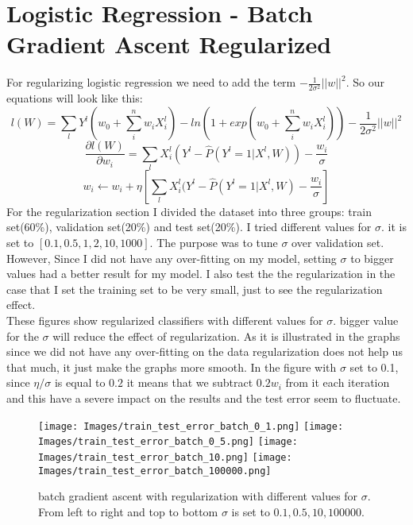 \documentclass[12pt]{article}
\begin{document}
\section{Logistic Regression - Batch Gradient Ascent Regularized}
For regularizing logistic regression we need to add the term $-\frac{1}{2\sigma^2}||w||^2$. So our equations will look like this:
\begin{equation}\label{likelihood_reg}
	l(W)=\sum\limits_{l}Y^l(w_0+\sum\limits_{i}^n w_iX_i^l)-ln(1+exp(w_0+\sum\limits_{i}^n w_iX_i^l))-\frac{1}{2\sigma^2}||w||^2
\end{equation}
\begin{equation}\label{derivative_reg}
	\frac{\partial l(W)}{\partial w_i} = \sum\limits_{l} X_i^l(Y^l-\hat{P}(Y^l=1|X^l,W))-\frac{w_i}{\sigma}
\end{equation}
\begin{equation}\label{update_rule_reg}
	w_i \leftarrow w_i + \eta\left[\sum\limits_{l} X_i^l(Y^l-\hat{P}(Y^l=1|X^l,W)-\frac{w_i}{\sigma}\right]
\end{equation}
For the regularization section I divided the dataset into three groups: train set(60\%), validation set(20\%) and test set(20\%). I tried different values for $\sigma$. it is set to $[0.1, 0.5,1,2,10,1000]$. The purpose was to tune $\sigma$ over validation set. However, Since I did not have any over-fitting on my model, setting $\sigma$ to bigger values had a better result for my model. I also test the the regularization in the case that I set the training set to be very small, just to see the regularization effect.\\
These figures show regularized classifiers with different values for $\sigma$.
bigger value for the $\sigma$ will reduce the effect of regularization. As it is illustrated in the graphs since we did not have any over-fitting on the data regularization does not help us that much, it just make the graphs more smooth. In the figure with $\sigma$ set to 0.1, since $\eta/\sigma$ is equal to $0.2$ it means that we subtract $0.2w_i$ from it each iteration and this have a severe impact on the results and the test error seem to fluctuate.
\begin{figure}
  \caption{batch gradient ascent with regularization with different values for $\sigma$. From left to right and top to bottom $\sigma$ is set to $0.1, 0.5, 10, 100000$.}
  \centering
  \texttt{[image: Images/train\_test\_error\_batch\_0\_1.png]}
  \texttt{[image: Images/train\_test\_error\_batch\_0\_5.png]}
  \texttt{[image: Images/train\_test\_error\_batch\_10.png]}
    \texttt{[image: Images/train\_test\_error\_batch\_100000.png]}
  \label{fig:batch_reg}
\end{figure}
\end{document}
